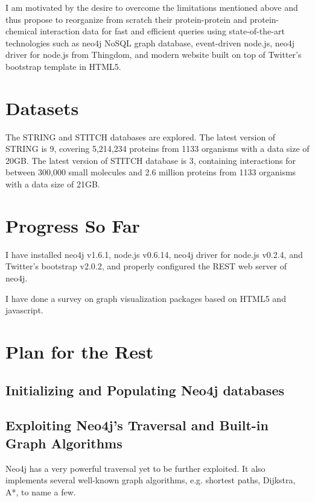 \documentclass[10pt,conference,compsocconf]{../IEEEtran}
\begin{document}
I am motivated by the desire to overcome the limitations mentioned above and thus propose to reorganize from scratch their protein-protein and protein-chemical interaction data for fast and efficient queries using state-of-the-art technologies such as neo4j NoSQL graph database, event-driven node.js, neo4j driver for node.js from Thingdom, and modern website built on top of Twitter's bootstrap template in HTML5.

\section{Datasets}

The STRING and STITCH databases are explored. The latest version of STRING is 9, covering 5,214,234 proteins from 1133 organisms with a data size of 20GB. The latest version of STITCH database is 3, containing interactions for between 300,000 small molecules and 2.6 million proteins from 1133 organisms with a data size of 21GB.

\section{Progress So Far}

I have installed neo4j v1.6.1, node.js v0.6.14, neo4j driver for node.js v0.2.4, and Twitter's bootstrap v2.0.2, and properly configured the REST web server of neo4j.

I have done a survey on graph visualization packages based on HTML5 and javascript.

\section{Plan for the Rest}

\subsection{Initializing and Populating Neo4j databases}



\subsection{Exploiting Neo4j's Traversal and Built-in Graph Algorithms}

Neo4j has a very powerful traversal yet to be further exploited. It also implements several well-known graph algorithms, e.g. shortest paths, Dijkstra, A*, to name a few.
\end{document}
